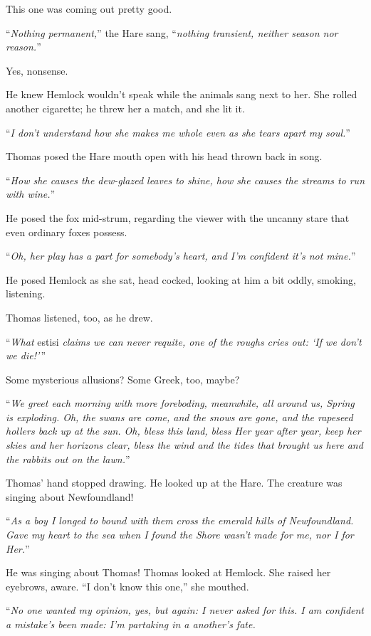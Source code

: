 \documentclass[11pt,a5paper]{article}
\begin{document}
This one was coming out pretty good.

``\emph{Nothing permanent,}'' the Hare sang, ``\emph{nothing transient, neither season nor reason.}''

Yes, nonsense.

He knew Hemlock wouldn't speak while the animals sang next to her. She rolled another cigarette; he threw her a match, and she lit it.

``\emph{I don't understand how she makes me whole even as she tears apart my soul.}''

Thomas posed the Hare mouth open with his head thrown back in song.

``\emph{How she causes the dew-glazed leaves to shine, how she causes the streams to run with wine.}''

He posed the fox mid-strum, regarding the viewer with the uncanny stare that even ordinary foxes possess.

``\emph{Oh, her play has a part for somebody's heart, and I'm confident it's not mine.}''

He posed Hemlock as she sat, head cocked, looking at him a bit oddly, smoking, listening.

Thomas listened, too, as he drew.

``\emph{What} estisi \emph{claims we can never requite, one of the roughs cries out: `If we don't we die!'}\,''

Some mysterious allusions? Some Greek, too, maybe?

``\emph{We greet each morning with more foreboding, meanwhile, all around us, Spring is exploding. Oh, the swans are come, and the snows are gone, and the rapeseed hollers back up at the sun. Oh, bless this land, bless Her year after year, keep her skies and her horizons clear, bless the wind and the tides that brought us here and the rabbits out on the lawn.}''

Thomas' hand stopped drawing. He looked up at the Hare. The creature was singing about Newfoundland!

``\emph{As a boy I longed to bound with them cross the emerald hills of Newfoundland. Gave my heart to the sea when I found the Shore wasn't made for me, nor I for Her.}''

He was singing about Thomas! Thomas looked at Hemlock. She raised her eyebrows, aware. ``I don't know this one,'' she mouthed.

``\emph{No one wanted my opinion, yes, but again: I never asked for this. I am confident a mistake's been made: I'm partaking in a another's fate.}
\end{document}
